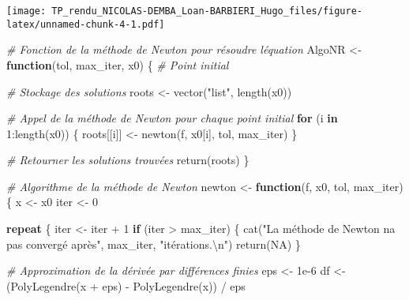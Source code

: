 \documentclass[
]{article}
\newenvironment{Shaded}{\begin{snugshade}}{\end{snugshade}}
\newcommand{\CommentTok}[1]{\textcolor[rgb]{0.56,0.35,0.01}{\textit{#1}}}
\newcommand{\ConstantTok}[1]{\textcolor[rgb]{0.00,0.00,0.00}{#1}}
\newcommand{\ControlFlowTok}[1]{\textcolor[rgb]{0.13,0.29,0.53}{\textbf{#1}}}
\newcommand{\DecValTok}[1]{\textcolor[rgb]{0.00,0.00,0.81}{#1}}
\newcommand{\FloatTok}[1]{\textcolor[rgb]{0.00,0.00,0.81}{#1}}
\newcommand{\FunctionTok}[1]{\textcolor[rgb]{0.00,0.00,0.00}{#1}}
\newcommand{\NormalTok}[1]{#1}
\newcommand{\OtherTok}[1]{\textcolor[rgb]{0.56,0.35,0.01}{#1}}
\newcommand{\SpecialCharTok}[1]{\textcolor[rgb]{0.00,0.00,0.00}{#1}}
\newcommand{\StringTok}[1]{\textcolor[rgb]{0.31,0.60,0.02}{#1}}
\begin{document}
\texttt{[image: TP\_rendu\_NICOLAS-DEMBA\_Loan-BARBIERI\_Hugo\_files/figure-latex/unnamed-chunk-4-1.pdf]}

\begin{Shaded}
\begin{Highlighting}[]
\CommentTok{\# Fonction de la méthode de Newton pour résoudre l\textquotesingle{}équation}
\NormalTok{AlgoNR }\OtherTok{\textless{}{-}} \ControlFlowTok{function}\NormalTok{(tol, max\_iter, x0) \{}
  \CommentTok{\# Point initial}


  \CommentTok{\# Stockage des solutions}
\NormalTok{  roots }\OtherTok{\textless{}{-}} \FunctionTok{vector}\NormalTok{(}\StringTok{"list"}\NormalTok{, }\FunctionTok{length}\NormalTok{(x0))}

  \CommentTok{\# Appel de la méthode de Newton pour chaque point initial}
  \ControlFlowTok{for}\NormalTok{ (i }\ControlFlowTok{in} \DecValTok{1}\SpecialCharTok{:}\FunctionTok{length}\NormalTok{(x0)) \{}
\NormalTok{    roots[[i]] }\OtherTok{\textless{}{-}} \FunctionTok{newton}\NormalTok{(f, x0[i], tol, max\_iter)}
\NormalTok{  \}}

  \CommentTok{\# Retourner les solutions trouvées}
  \FunctionTok{return}\NormalTok{(roots)}
\NormalTok{\}}

\CommentTok{\# Algorithme de la méthode de Newton}
\NormalTok{newton }\OtherTok{\textless{}{-}} \ControlFlowTok{function}\NormalTok{(f, x0, tol, max\_iter) \{}
\NormalTok{  x }\OtherTok{\textless{}{-}}\NormalTok{ x0}
\NormalTok{  iter }\OtherTok{\textless{}{-}} \DecValTok{0}
  
  \ControlFlowTok{repeat}\NormalTok{ \{}
\NormalTok{    iter }\OtherTok{\textless{}{-}}\NormalTok{ iter }\SpecialCharTok{+} \DecValTok{1}
    \ControlFlowTok{if}\NormalTok{ (iter }\SpecialCharTok{\textgreater{}}\NormalTok{ max\_iter) \{}
      \FunctionTok{cat}\NormalTok{(}\StringTok{"La méthode de Newton n\textquotesingle{}a pas convergé après"}\NormalTok{, max\_iter, }\StringTok{"itérations.}\SpecialCharTok{\textbackslash{}n}\StringTok{"}\NormalTok{)}
      \FunctionTok{return}\NormalTok{(}\ConstantTok{NA}\NormalTok{)}
\NormalTok{    \}}
    
    \CommentTok{\# Approximation de la dérivée par différences finies}
\NormalTok{    eps }\OtherTok{\textless{}{-}} \FloatTok{1e{-}6}
\NormalTok{    df }\OtherTok{\textless{}{-}}\NormalTok{ (}\FunctionTok{PolyLegendre}\NormalTok{(x }\SpecialCharTok{+}\NormalTok{ eps) }\SpecialCharTok{{-}} \FunctionTok{PolyLegendre}\NormalTok{(x)) }\SpecialCharTok{/}\NormalTok{ eps}
    

\end{Highlighting}
\end{Shaded}
\end{document}
